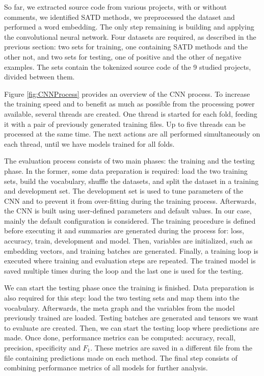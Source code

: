 So far, we extracted source code from various projects, with or without comments, we identified SATD methods, we preprocessed the dataset and performed a word embedding. The only step remaining is building and applying the convolutional neural network. Four datasets are required, as described in the previous section: two sets for training, one containing SATD methods and the other not, and two sets for testing, one of positive and the other of negative examples. The sets contain the tokenized source code of the 9 studied projects, divided between them.

Figure \ref{fig:CNNProcess} provides an overview of the CNN process. To increase the training speed and to benefit as much as possible from the processing power available, several threads are created. One thread is started for each fold, feeding it with a pair of previously generated training files. Up to five threads can be processed at the same time. The next actions are all performed simultaneously on each thread, until we have models trained for all folds. 

The evaluation process consists of two main phases: the training and the testing phase. In the former, some data preparation is required: load the two training sets, build the vocabulary, shuffle the datasets, and split the dataset in a training and development set. The development set is used to tune parameters of the CNN and to prevent it from over-fitting during the training process. Afterwards, the CNN is built using user-defined parameters and default values. In our case, mainly the default configuration is considered. The training procedure is defined before executing it and summaries are generated during the process for: loss, accuracy, train, development and model. Then, variables are initialized, such as embedding vectors, and training batches are generated. Finally, a training loop is executed where training and evaluation steps are repeated. The trained model is saved multiple times during the loop and the last one is used for the testing. 

We can start the testing phase once the training is finished. Data preparation is also required for this step: load the two testing sets and map them into the vocabulary. Afterwards, the meta graph and the variables from the model previously trained are loaded. Testing batches are generated and tensors we want to evaluate are created. Then, we can start the testing loop where predictions are made. Once done, performance metrics can be computed: accuracy, recall, precision, specificity and $F_1$. These metrics are saved in a different file from the file containing predictions made on each method. The final step consists of combining performance metrics of all models for further analysis.

